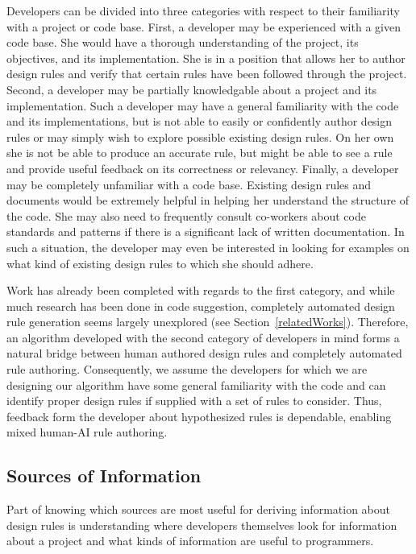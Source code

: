 \documentclass[12pt]{article}
\begin{document}
Developers can be divided into three categories with respect to their familiarity with a project or code base. First, a developer may be experienced with a given code base. She would have a thorough understanding of the project, its objectives, and its implementation. She is in a position that allows her to author design rules and verify that certain rules have been followed through the project. Second, a developer may be partially knowledgable about a project and its implementation. Such a developer may have a general familiarity with the code and its implementations, but is not able to easily or confidently author design rules or may simply wish to explore possible existing design rules. On her own she is not be able to produce an accurate rule, but might be able to see a rule and provide useful feedback on its correctness or relevancy. Finally, a developer may be completely unfamiliar with a code base. Existing design rules and documents would be extremely helpful in helping her understand the structure of the code. She may also need to frequently consult co-workers about code standards and patterns if there is a significant lack of written documentation. In such a situation, the developer may even be interested in looking for examples on what kind of existing design rules to which she should adhere.

 Work has already been completed with regards to the first category, and while much research has been done in code suggestion, completely automated design rule generation seems largely unexplored (see Section~\ref{relatedWorks}). Therefore, an algorithm developed with the second category of developers in mind forms a natural bridge between human authored design rules and completely automated rule authoring. Consequently, we assume the developers for which we are designing our algorithm have some general familiarity with the code and can identify proper design rules if supplied with a set of rules to consider. Thus, feedback form the developer about hypothesized rules is dependable, enabling mixed human-AI rule authoring.


\subsection{Sources of Information} \label{infoSrcs}

Part of knowing which sources are most useful for deriving information about design rules is understanding where developers themselves look for information about a project and what kinds of information are useful to programmers.  
\end{document}
